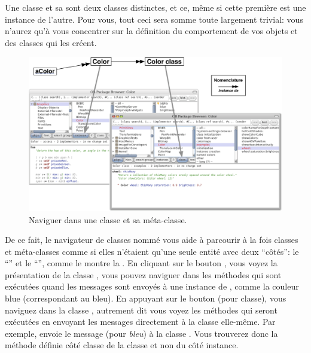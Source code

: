 \documentclass[a4paper,10pt,twoside]{book}
\begin{document}
Une classe et sa  sont deux classes distinctes, et ce, même si cette première est une instance de l'autre. Pour vous, tout ceci sera somme toute largement trivial: vous n'aurez qu'à vous concentrer sur la définition du comportement de vos objets et des classes qui les créent.

\begin{figure}[htb]
\begin{center}
\includegraphics[width=\textwidth]{Color-Buttons}
\caption{Naviguer dans une classe et sa méta-classe.
}
\end{center}
\end{figure}

De ce fait, le navigateur de classes nommé  vous
aide à parcourir à la fois classes et méta-classes comme si elles
n'étaient qu'une seule entité avec deux ``côtés'': le ``'' et le ``'', comme le montre la . 
En cliquant sur le 
bouton , vous voyez la présentation de la classe , \ie vous pouvez naviguer dans les méthodes qui sont exécutées quand les messages sont envoyés à une instance de
, comme la couleur blue (correspondant au bleu). En appuyant
sur le bouton  (pour classe), vous naviguez dans la classe , autrement dit vous voyez les méthodes qui seront exécutées en envoyant les messages directement à la classe  elle-même.
Par exemple,  envoie le message  (pour \emph{bleu}) à la classe .
Vous trouverez donc la méthode  définie côté classe de la classe  et non du côté instance.
\end{document}
